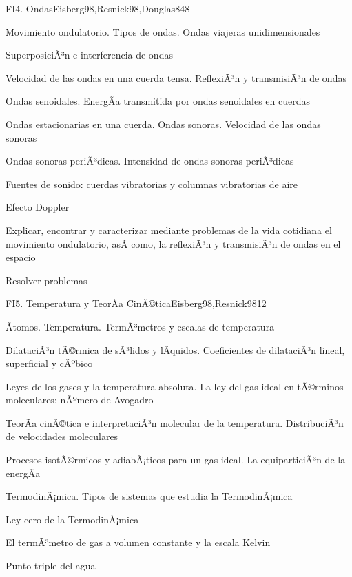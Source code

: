 \begin{syllabus}
\begin{unit}{FI4. Ondas}{Eisberg98,Resnick98,Douglas84}{8}
\begin{topics}
         \item  Movimiento ondulatorio. Tipos de ondas. Ondas viajeras unidimensionales
	 \item  SuperposiciÃ³n e interferencia de ondas
         \item  Velocidad de las ondas en una cuerda tensa. ReflexiÃ³n y transmisiÃ³n de ondas
	 \item  Ondas senoidales. EnergÃ­a transmitida por ondas senoidales en cuerdas
         \item  Ondas estacionarias en una cuerda. Ondas sonoras. Velocidad de las ondas sonoras
	 \item  Ondas sonoras periÃ³dicas. Intensidad de ondas sonoras periÃ³dicas
	 \item  Fuentes de sonido: cuerdas vibratorias y columnas vibratorias de aire
	 \item  Efecto Doppler
   \end{topics}

   \begin{unitgoals}
         \item  Explicar, encontrar y caracterizar mediante problemas de la vida cotidiana el movimiento ondulatorio, asÃ­ como, la reflexiÃ³n y transmisiÃ³n de ondas en el espacio
         \item  Resolver problemas
   \end{unitgoals}
\end{unit}

\begin{unit}{FI5. Temperatura y TeorÃ­a CinÃ©tica}{Eisberg98,Resnick98}{12}
\begin{topics}
         \item  Ãtomos. Temperatura. TermÃ³metros y escalas de temperatura
	 \item  DilataciÃ³n tÃ©rmica de sÃ³lidos y lÃ­quidos. Coeficientes de dilataciÃ³n lineal, superficial y cÃºbico
         \item  Leyes de los gases y la temperatura absoluta. La ley del gas ideal en tÃ©rminos moleculares: nÃºmero de Avogadro
	 \item  TeorÃ­a cinÃ©tica e interpretaciÃ³n molecular de la temperatura. DistribuciÃ³n de velocidades moleculares
         \item  Procesos isotÃ©rmicos y adiabÃ¡ticos para un gas ideal. La equiparticiÃ³n de la energÃ­a
	 \item  TermodinÃ¡mica. Tipos de sistemas que estudia la TermodinÃ¡mica
         \item  Ley cero de la TermodinÃ¡mica
	 \item  El termÃ³metro de gas a volumen constante y la escala Kelvin
         \item  Punto triple del agua
   \end{topics}


\end{unit}
\end{syllabus}
